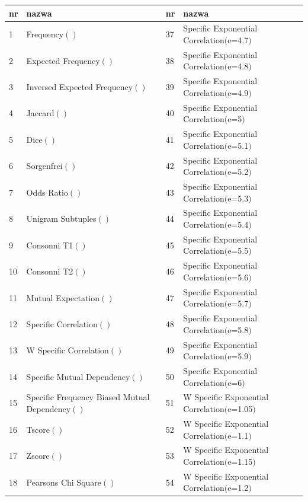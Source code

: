 \documentclass[11pt,a4paper]{llncs}
\begin{document}
\begin{table}[h!]
\centering
\footnotesize\setlength{\tabcolsep}{2.5pt}
\begin{tabular}{ l | l || l | l }
	\toprule
	\textbf{nr} 	& \textbf{nazwa}	& \textbf{nr}	& \textbf{nazwa}	\\
	\midrule
	1	&	Frequency$()$									& 37	&	Specific Exponential Correlation$($e=4.7$)$		\\
	2	&	Expected Frequency$()$							& 38	&	Specific Exponential Correlation$($e=4.8$)$		\\
	3	&	Inversed Expected Frequency$()$					& 39	&	Specific Exponential Correlation$($e=4.9$)$		\\
	4	&	Jaccard$()$										& 40	&	Specific Exponential Correlation$($e=5$)$		\\
	5	&	Dice$()$										& 41	&	Specific Exponential Correlation$($e=5.1$)$		\\
	6	&	Sorgenfrei$()$									& 42	&	Specific Exponential Correlation$($e=5.2$)$		\\
	7	&	Odds Ratio$()$									& 43	&	Specific Exponential Correlation$($e=5.3$)$		\\
	8	&	Unigram Subtuples$()$							& 44	&	Specific Exponential Correlation$($e=5.4$)$		\\
	9	&	Consonni T1$()$									& 45	&	Specific Exponential Correlation$($e=5.5$)$		\\
	10	&	Consonni T2$()$									& 46	&	Specific Exponential Correlation$($e=5.6$)$		\\
	11	&	Mutual Expectation$()$							& 47	&	Specific Exponential Correlation$($e=5.7$)$		\\
	12	&	Specific Correlation$()$						& 48	&	Specific Exponential Correlation$($e=5.8$)$		\\
	13	&	W Specific Correlation$()$						& 49	&	Specific Exponential Correlation$($e=5.9$)$		\\
	14	&	Specific Mutual Dependency$()$					& 50	&	Specific Exponential Correlation$($e=6$)$		\\
	15	&	Specific Frequency Biased Mutual Dependency$()$	& 51	&	W Specific Exponential Correlation$($e=1.05$)$	\\
	16	&	Tscore$()$										& 52 	& 	W Specific Exponential Correlation$($e=1.1$)$	\\
	17	&	Zscore$()$										& 53 	& 	W Specific Exponential Correlation$($e=1.15$)$	\\
	18	&	Pearsons Chi Square$()$							& 54	&	W Specific Exponential Correlation$($e=1.2$)$	\\

\end{tabular}
\end{table}
\end{document}
